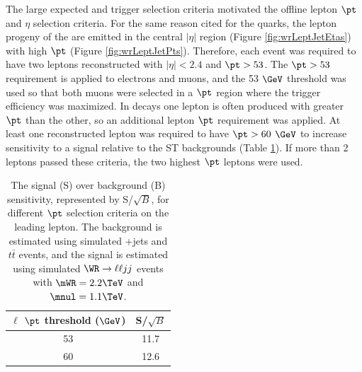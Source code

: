

The large expected \mWR and trigger selection criteria motivated the offline lepton $\pt$ and $\eta$ selection criteria.  For the same 
reason cited for the \WR quarks, the lepton progeny of the \WR are emitted in the central $|\eta|$ region (Figure \ref{fig:wrLeptJetEtas}) 
with high $\pt$ (Figure \ref{fig:wrLeptJetPts}).  Therefore, each event was required to have two leptons reconstructed with $|\eta| < 2.4$ 
and $\pt > 53$.  The $\pt > 53$ requirement is applied to electrons and muons, and the 53 $\GeV$ threshold was used so that both muons 
were selected in a $\pt$ region where the trigger efficiency was maximized.  In \WR decays one lepton is often produced with greater 
$\pt$ than the other, so an additional lepton $\pt$ requirement was applied.  At least one reconstructed lepton was required to have 
$\pt > 60$ $\GeV$ to increase sensitivity to a \WR signal relative to the ST backgrounds (Table \ref{tab:lowerLeptPtCut}).  If more than 
2 leptons passed these criteria, the two highest $\pt$ leptons were used.

\begin{table}[h]
	\caption{The signal (S) over background (B) sensitivity, represented by S/$\sqrt{B}$, for different $\pt$ selection 
		criteria on the leading lepton.  The background is estimated using simulated \DY+jets and $t\bar{t}$ events, and the 
		signal is estimated using simulated $\WR \rightarrow \ell\ell jj$ events with $\mWR = 2.2 \TeV$ and $\mnul = 1.1 \TeV$.}
	\label{tab:lowerLeptPtCut}
	\centering
	\begin{tabular}{c|c}
		$\ell$ $\pt$ threshold ($\GeV$) & S/$\sqrt{B}$ \\  \hline
		53 &  11.7  \\
		60 &  12.6  \\ \hline
	\end{tabular}
\end{table}

